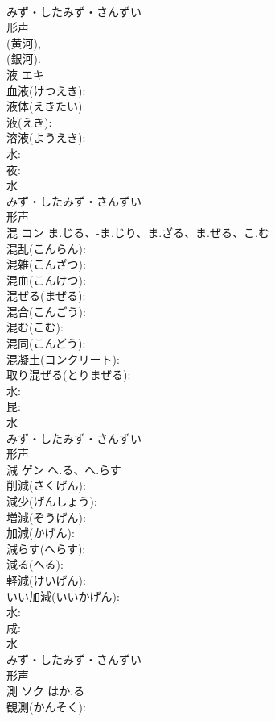 \documentclass[8pt]{extreport}
\begin{document}
\begin{CJK}{UTF8}{min}
\\	みず・したみず・さんずい	
\\	形声 
\\	(黄河), 
\\	(銀河). 
\\	液	エキ			
\\	血液(けつえき): 
\\	液体(えきたい): 
\\	液(えき): 
\\	溶液(ようえき): 
\\	水: 
\\	夜: 
\\	水	
\\	みず・したみず・さんずい	
\\	形声 
\\	混	コン	ま.じる、-ま.じり、ま.ざる、ま.ぜる、こ.む		
\\	混乱(こんらん): 
\\	混雑(こんざつ): 
\\	混血(こんけつ): 
\\	混ぜる(まぜる): 
\\	混合(こんごう): 
\\	混む(こむ): 
\\	混同(こんどう): 
\\	混凝土(コンクリート): 
\\	取り混ぜる(とりまぜる): 
\\	水: 
\\	昆: 
\\	水	
\\	みず・したみず・さんずい	
\\	形声 
\\	減	ゲン	へ.る、へ.らす		
\\	削減(さくげん): 
\\	減少(げんしょう): 
\\	増減(ぞうげん): 
\\	加減(かげん): 
\\	減らす(へらす): 
\\	減る(へる): 
\\	軽減(けいげん): 
\\	いい加減(いいかげん): 
\\	水: 
\\	咸: 
\\	水	
\\	みず・したみず・さんずい	
\\	形声 
\\	測	ソク	はか.る		
\\	観測(かんそく): 

\end{CJK}
\end{document}
